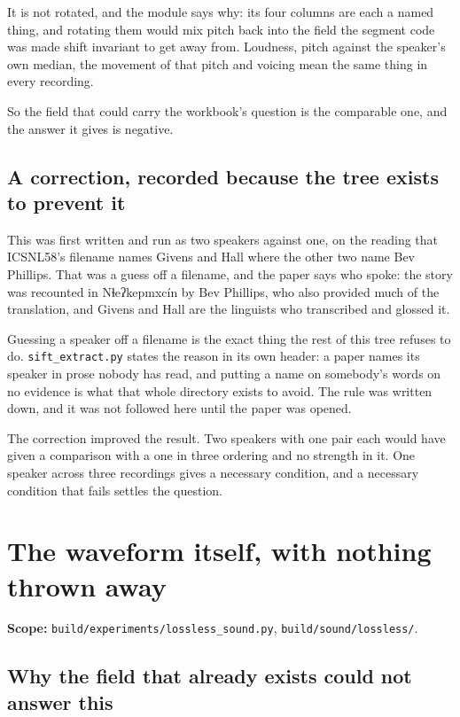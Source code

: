 It is not rotated, and the module says why: its four columns are each a named thing, and rotating
them would mix pitch back into the field the segment code was made shift invariant to get away from.
Loudness, pitch against the speaker's own median, the movement of that pitch and voicing mean the
same thing in every recording.

So the field that could carry the workbook's question is the comparable one, and the
answer it gives is negative.

\subsection{A correction, recorded because the tree exists to prevent it}

This was first written and run as two speakers against one, on the reading that ICSNL58's filename
names Givens and Hall where the other two name Bev Phillips. That was a guess off a filename, and
the paper says who spoke: the story was recounted in Nɬeʔkepmxcín by Bev Phillips, who also provided
much of the translation, and Givens and Hall are the linguists who transcribed and glossed it.

Guessing a speaker off a filename is the exact thing the rest of this tree refuses to do.
\texttt{sift\_\allowbreak{}extract.\allowbreak{}py} states the reason in its own header: a paper names
its speaker in prose nobody has read, and putting a name on somebody's words on no evidence is what
that whole directory exists to avoid. The rule was written down, and it was not followed here until
the paper was opened.

The correction improved the result. Two speakers with one pair each would have given a comparison
with a one in three ordering and no strength in it. One speaker across three recordings gives a
necessary condition, and a necessary condition that fails settles the question.

\section{The waveform itself, with nothing thrown away}

\textbf{Scope:} \texttt{build/\allowbreak{}experiments/\allowbreak{}lossless\_\allowbreak{}sound.\allowbreak{}py},
\texttt{build/\allowbreak{}sound/\allowbreak{}lossless/\allowbreak{}}.

\subsection{Why the field that already exists could not answer this}

